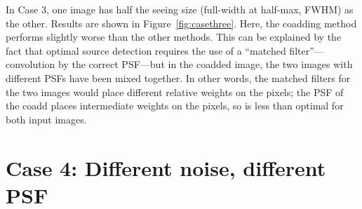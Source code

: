 \documentclass[letter,11pt]{article}
\begin{document}
In Case 3, one image has half the seeing size (full-width at half-max,
FWHM) as the other.  Results are shown in Figure~\ref{fig:casethree}.
Here, the coadding method performs slightly worse than the other
methods.  This can be explained by the fact that optimal source
detection requires the use of a ``matched filter''---convolution by
the correct PSF---but in the coadded image, the two images with
different PSFs have been mixed together.  In other words, the matched
filters for the two images would place different relative weights on
the pixels; the PSF of the coadd places intermediate weights on
the pixels, so is less than optimal for both input images.

\newpage

\section*{Case 4: Different noise, different PSF}
\end{document}
